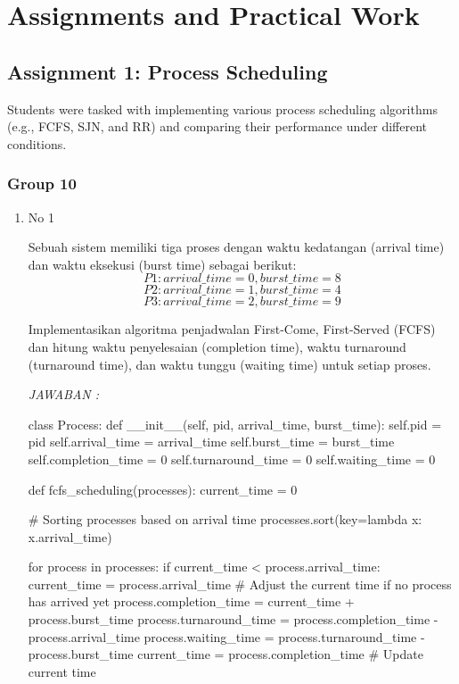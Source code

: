 \documentclass[12pt]{article}
\begin{document}
\section{Assignments and Practical Work}
\subsection{Assignment 1: Process Scheduling}
Students were tasked with implementing various process scheduling algorithms (e.g., FCFS, SJN, and RR) and comparing their performance under different conditions.
\subsubsection{Group 10}

\begin{enumerate}
    \item No 1

Sebuah sistem memiliki tiga proses dengan waktu kedatangan (arrival time) dan waktu eksekusi (burst time) sebagai berikut:  
\[P1: arrival\_time = 0, burst\_time = 8\]  
\[P2: arrival\_time = 1, burst\_time = 4\]  
\[P3: arrival\_time = 2, burst\_time = 9\]  

Implementasikan algoritma penjadwalan First-Come, First-Served (FCFS) dan hitung waktu penyelesaian (completion time), waktu turnaround (turnaround time), dan waktu tunggu (waiting time) untuk setiap proses.

\textit{JAWABAN : }
\begin{python}
class Process:
    def __init__(self, pid, arrival_time, burst_time):
        self.pid = pid
        self.arrival_time = arrival_time
        self.burst_time = burst_time
        self.completion_time = 0
        self.turnaround_time = 0
        self.waiting_time = 0

def fcfs_scheduling(processes):
    current_time = 0
    
    # Sorting processes based on arrival time
    processes.sort(key=lambda x: x.arrival_time)
    
    for process in processes:
        if current_time < process.arrival_time:
            current_time = process.arrival_time  # Adjust the current time if no process has arrived yet
        process.completion_time = current_time + process.burst_time
        process.turnaround_time = process.completion_time - process.arrival_time
        process.waiting_time = process.turnaround_time - process.burst_time
        current_time = process.completion_time  # Update current time


\end{python}
\end{enumerate}
\end{document}
